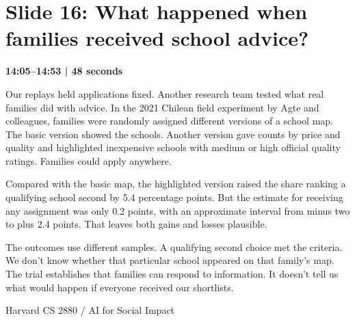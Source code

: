 \documentclass[11pt]{article}
\begin{document}
\section*{Slide 16: What happened when families received school advice?}
{\color{navy}\textbf{14:05--14:53 | 48 seconds}}\par\medskip
Our replays held applications fixed. Another research team tested what real families did with advice. In the 2021 Chilean field experiment by Agte and colleagues, families were randomly assigned different versions of a school map. The basic version showed the schools. Another version gave counts by price and quality and highlighted inexpensive schools with medium or high official quality ratings. Families could apply anywhere.
\par
Compared with the basic map, the highlighted version raised the share ranking a qualifying school second by 5.4 percentage points. But the estimate for receiving any assignment was only 0.2 points, with an approximate interval from minus two to plus 2.4 points. That leaves both gains and losses plausible.
\par
The outcomes use different samples. A qualifying second choice met the criteria. We don't know whether that particular school appeared on that family's map. The trial establishes that families can respond to information. It doesn't tell us what would happen if everyone received our shortlists.
\par
\newpage
{\small Harvard CS 2880 / AI for Social Impact}\par
\end{document}
